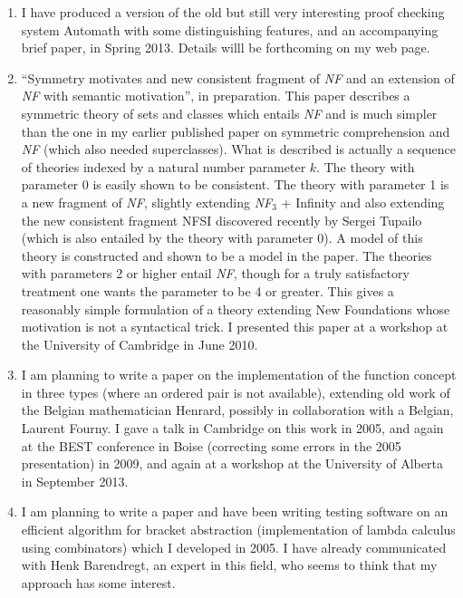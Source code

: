 \begin{description}
\begin{enumerate}
\item  I have produced a version of the old but still very interesting proof checking system Automath with some distinguishing features, and an accompanying brief paper, in Spring 2013.   Details willl be forthcoming on my web page.



\item ``Symmetry motivates and new consistent fragment of {\em NF\/}
and an extension of {\em NF\/} with semantic motivation'', in
preparation.   This paper describes a
symmetric theory of sets and classes which entails {\em NF\/} and is
much simpler than the one in my earlier published paper on symmetric
comprehension and {\em NF\/} (which also needed superclasses).  What
is described is actually a sequence of theories indexed by a natural
number parameter $k$.  The theory with parameter 0 is easily shown to
be consistent.  The theory with parameter 1 is a new fragment of {\em
NF\/}, slightly extending {\em NF$_3$\/} + Infinity and also extending
the new consistent fragment NFSI discovered recently by Sergei Tupailo
(which is also entailed by the theory with parameter 0).  A model of
this theory is constructed and shown to be a model in the paper.  The
theories with parameters 2 or higher entail {\em NF\/}, though for a
truly satisfactory treatment one wants the parameter to be 4 or
greater.  This gives a reasonably simple formulation of a theory
extending New Foundations whose motivation is not a syntactical trick.
I presented this paper at a workshop at the University of Cambridge in
June 2010.

\item I am planning to write a paper on the implementation of the
function concept in three types (where an ordered pair is not
available), extending old work of the Belgian mathematician Henrard,
possibly in collaboration with a Belgian, Laurent Fourny.  I gave a
talk in Cambridge on this work in 2005, and again at the BEST
conference in Boise (correcting some errors in the 2005 presentation)
in 2009, and again at a workshop at the University of Alberta in September 2013.

\item I am planning to write a paper and have been writing testing
software on an efficient algorithm for bracket abstraction
(implementation of lambda calculus using combinators) which I
developed in 2005.  I have already communicated with Henk Barendregt,
an expert in this field, who seems to think that my approach has some
interest.


\end{enumerate}
\end{description}
